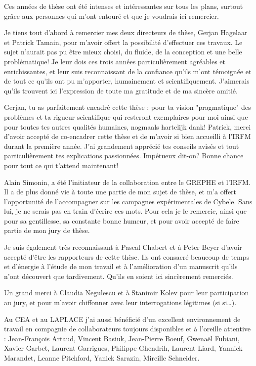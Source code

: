 \thispagestyle{preface}
\iffalse 
Ces années de thèse ont été intenses et intéressantes sur tous
les plans, surtout grâce aux personnes qui m’ont entouré et que je voudrais ici
remercier.

Je tiens tout d'abord à remercier mes deux directeurs de thèse, Gerjan Hagelaar
et Patrick Tamain, pour m'avoir offert la possibilité d'effectuer ces travaux.
Le sujet n'aurait pas pu être mieux choisi, du fluide, de la conception et une
belle problématique! Je leur dois ces trois années
particulièrement agréables et enrichissantes, et leur suis reconnaissant de la
confiance qu'ils m'ont témoignée et de tout ce qu'ils ont pu m'apporter,
humainement et scientifiquement. J'aimerais qu'ils trouvent ici l'expression de toute ma
gratitude et de ma sincère amitié. 

Gerjan, tu as parfaitement encadré cette
thèse ; pour ta vision "pragmatique" des problèmes et ta rigueur
scientifique qui resteront exemplaires pour moi ainsi que pour toutes tes autres
qualités humaines, nogmaals hartelijk dank!
Patrick, merci d'avoir accepté de co-encadrer cette thèse et de m'avoir si bien
accueilli à l'IRFM durant la première année. J'ai grandement apprécié tes
conseils avisés et tout particulièrement tes explications passionnées.
Impétueux dit-on? Bonne chance pour tout ce qui t'attend maintenant!

Alain Simonin, a été l'initiateur de la collaboration entre le GREPHE et
l'IRFM. Il a de plus donné vie à toute une partie de mon sujet de
thèse, et m'a offert l'opportunité de l'accompagner sur les campagnes
expérimentales de Cybele. Sans lui, je ne serais pas en train d'écrire ces mots.
Pour cela je le remercie, ainsi que pour sa gentillesse, sa constante bonne
humeur, et pour avoir accepté de faire partie de mon jury de thèse.

Je suis également très reconnaissant à Pascal Chabert et à Peter Beyer d'avoir
accepté d'être les rapporteurs de cette thèse. Ils ont consacré
beaucoup de temps et d'énergie à l'étude de mon travail et à l'amélioration d'un
manuscrit qu'ils n'ont découvert que tardivement. Qu'ils en soient ici
sincèrement remerciés.

Un grand merci à Claudia Negulescu et à Stanimir Kolev pour leur participation
au jury, et pour m'avoir chiffonner avec leur interrogations légitimes (si
si\ldots).

Au CEA et au LAPLACE j’ai aussi bénéficié d’un excellent
environnement de travail en compagnie de collaborateurs toujours disponibles et
à l'oreille attentive :
Jean-François Artaud, Vincent Basiuk,
Jean-Pierre Boeuf,
Gwenaël Fubiani,
Xavier Garbet,
Laurent Garrigues,
Philippe Ghendrih, 
Laurent Liard,
Yannick Marandet,
Leanne Pitchford,
Yanick Sarazin,
Mireille Schneider. 


